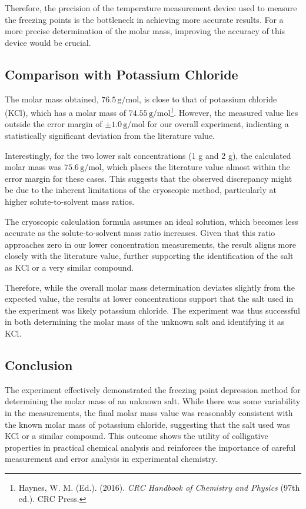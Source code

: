 \documentclass[a4paper,12pt]{article}
\begin{document}
Therefore, the precision of the temperature measurement device used to measure the freezing points is the bottleneck in achieving more accurate results. For a more precise determination of the molar mass, improving the accuracy of this device would be crucial.

\subsection{Comparison with Potassium Chloride}
The molar mass obtained, $76.5 \, \text{g/mol}$, is close to that of potassium chloride (KCl), which has a molar mass of $74.55 \, \text{g/mol}$\footnote{Haynes, W. M. (Ed.). (2016). \textit{CRC Handbook of Chemistry and Physics} (97th ed.). CRC Press.}. However, the measured value lies outside the error margin of $\pm 1.0 \, \text{g/mol}$ for our overall experiment, indicating a statistically significant deviation from the literature value.

Interestingly, for the two lower salt concentrations (1 g and 2 g), the calculated molar mass was $75.6 \, \text{g/mol}$, which places the literature value almost within the error margin for these cases. This suggests that the observed discrepancy might be due to the inherent limitations of the cryoscopic method, particularly at higher solute-to-solvent mass ratios.

The cryoscopic calculation formula assumes an ideal solution, which becomes less accurate as the solute-to-solvent mass ratio increases. Given that this ratio approaches zero in our lower concentration measurements, the result aligns more closely with the literature value, further supporting the identification of the salt as KCl or a very similar compound.

Therefore, while the overall molar mass determination deviates slightly from the expected value, the results at lower concentrations support that the salt used in the experiment was likely potassium chloride. The experiment was thus successful in both determining the molar mass of the unknown salt and identifying it as KCl.

\subsection{Conclusion}
The experiment effectively demonstrated the freezing point depression method for determining the molar mass of an unknown salt. While there was some variability in the measurements, the final molar mass value was reasonably consistent with the known molar mass of potassium chloride, suggesting that the salt used was KCl or a similar compound. This outcome shows the utility of colligative properties in practical chemical analysis and reinforces the importance of careful measurement and error analysis in experimental chemistry.
\end{document}
